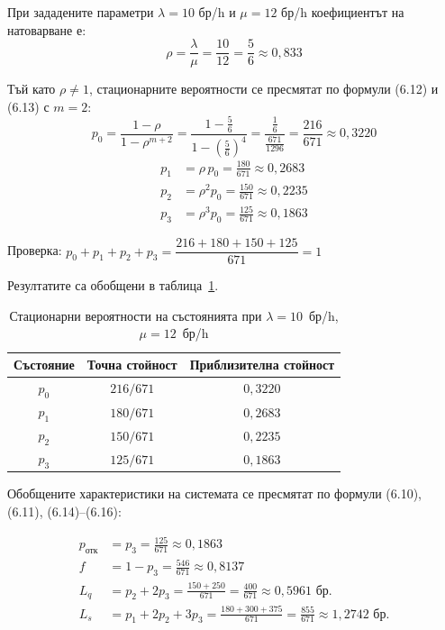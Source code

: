 При зададените параметри $\lambda = 10$ бр/h и $\mu = 12$ бр/h коефициентът на натоварване е:
\begin{equation}
	\rho = \frac{\lambda}{\mu} = \frac{10}{12} = \frac{5}{6} \approx 0{,}833 \tag{1}
\end{equation}

Тъй като $\rho \neq 1$, стационарните вероятности се пресмятат по формули (6.12) и (6.13) с $m = 2$:
\begin{equation}
	p_0 = \frac{1 - \rho}{1 - \rho^{m+2}} = \frac{1 - \tfrac{5}{6}}{1 - \left(\tfrac{5}{6}\right)^{4}}
	= \frac{\tfrac{1}{6}}{\tfrac{671}{1296}} = \frac{216}{671} \approx 0{,}3220 \tag{2}
\end{equation}
\begin{align*}
	p_1 &= \rho\, p_0 = \frac{180}{671} \approx 0{,}2683 \\
	p_2 &= \rho^2 p_0 = \frac{150}{671} \approx 0{,}2235 \\
	p_3 &= \rho^3 p_0 = \frac{125}{671} \approx 0{,}1863
\end{align*}

Проверка: $p_0 + p_1 + p_2 + p_3 = \dfrac{216 + 180 + 150 + 125}{671} = 1$ \checkmark

\vspace{0.5em}
Резултатите са обобщени в таблица~\ref{tab:steadystate}.

\begin{table}[h]
	\centering
	\caption{Стационарни вероятности на състоянията при $\lambda=10$~бр/h, $\mu=12$~бр/h}
	\label{tab:steadystate}
	\begin{tabular}{ccc}
		\toprule
		Състояние & Точна стойност & Приблизителна стойност \\
		\midrule
		$p_0$ & $216/671$ & $0{,}3220$ \\
		$p_1$ & $180/671$ & $0{,}2683$ \\
		$p_2$ & $150/671$ & $0{,}2235$ \\
		$p_3$ & $125/671$ & $0{,}1863$ \\
		\bottomrule
	\end{tabular}
\end{table}

Обобщените характеристики на системата се пресмятат по формули (6.10), (6.11), (6.14)--(6.16):

\begin{align*}
	p_{\text{отк}} &= p_3 = \frac{125}{671} \approx 0{,}1863 \\[4pt]
	f               &= 1 - p_3 = \frac{546}{671} \approx 0{,}8137 \\[4pt]
	L_q             &= p_2 + 2p_3 = \frac{150 + 250}{671} = \frac{400}{671} \approx 0{,}5961 \text{ бр.} \\[4pt]
	L_s             &= p_1 + 2p_2 + 3p_3 = \frac{180 + 300 + 375}{671} = \frac{855}{671} \approx 1{,}2742 \text{ бр.}
\end{align*}

